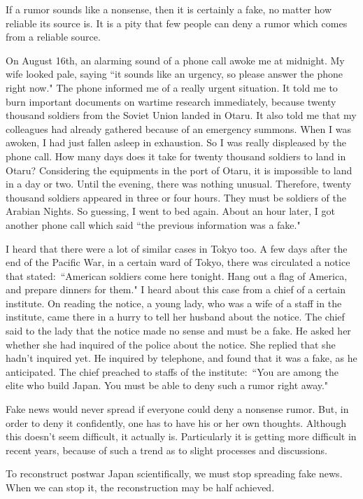\documentclass[11pt,a4j,twocolumn]{jarticle}
\begin{document}
If a rumor sounds like a nonsense,
then it is certainly a fake, no matter how reliable its source is.
It is a pity that few people can deny a rumor which comes from a reliable source.

On August 16th, an alarming sound of a phone call awoke me at midnight.
My wife looked pale, saying ``it sounds like an urgency, so please answer the phone right now."
The phone informed me of a really urgent situation.
It told me to burn important documents on wartime research immediately,
because twenty thousand soldiers from the Soviet Union landed in Otaru.
It also told me that my colleagues had already gathered because of an emergency summons.
When I was awoken, I had just fallen asleep in exhaustion.
So I was really displeased by the phone call.
How many days does it take for twenty thousand soldiers to land in Otaru?
Considering the equipments in the port of Otaru, it is impossible to land in a day or two.
Until the evening, there was nothing unusual. 
Therefore, twenty thousand soldiers appeared in three or four hours. 
They must be soldiers of the Arabian Nights. So guessing, I went to bed again.
About an hour later, I got another phone call which said ``the previous information was a fake."

I heard that there were a lot of similar cases in Tokyo too.
A few days after the end of the Pacific War, in a certain ward of Tokyo,
there was circulated a notice that stated:\ ``American soldiers come here tonight.
Hang out a flag of America, and prepare dinners for them."
I heard about this case from a chief of a certain institute.
On reading the notice, a young lady, who was a wife of a staff in the institute,
came there in a hurry to tell her husband about the notice.
The chief said to the lady that the notice made no sense and must be a fake.
He asked her whether she had inquired of the police about the notice.
She replied that she hadn't inquired yet.
He inquired by telephone, and found that it was a fake, as he anticipated.
The chief preached to staffs of the institute:\ ``You are among the elite who build Japan.
You must be able to deny such a rumor right away."

Fake news would never spread if everyone could deny a nonsense rumor.
But, in order to deny it confidently, one has to have his or her own thoughts.
Although this doesn't seem difficult, it actually is.
Particularly it is getting more difficult in recent years,
because of such a trend as to slight processes and discussions.

To reconstruct postwar Japan scientifically, we must stop spreading fake news.
When we can stop it, the reconstruction may be half achieved.
\end{document}
